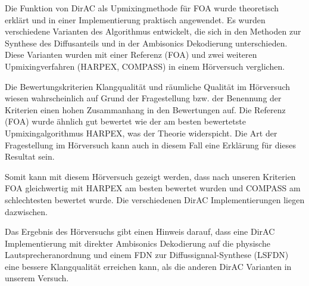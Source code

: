 Die Funktion von DirAC als Upmixingmethode für FOA wurde theoretisch erklärt und in einer Implementierung praktisch angewendet. Es wurden verschiedene Varianten des Algorithmus entwickelt, die sich in den Methoden zur Synthese des Diffusanteils und in der Ambisonics Dekodierung unterschieden. Diese Varianten wurden mit einer Referenz (FOA) und zwei weiteren Upmixingverfahren (HARPEX, COMPASS) in einem Hörversuch verglichen.

Die Bewertungskriterien Klangqualität und räumliche Qualität im Hörversuch wiesen wahrscheinlich auf Grund der Fragestellung bzw. der Benennung der Kriterien einen hohen Zusammanhang in den Bewertungen auf. Die Referenz (FOA) wurde ähnlich gut bewertet wie der am besten bewertetste Upmixingalgorithmus HARPEX, was der Theorie widerspicht. Die Art der Fragestellung im Hörversuch kann auch in diesem Fall eine Erklärung für dieses Resultat sein.

Somit kann mit diesem Hörversuch gezeigt werden, dass nach unseren Kriterien FOA gleichwertig mit HARPEX am besten bewertet wurden und COMPASS am schlechtesten bewertet wurde. Die verschiedenen DirAC Implementierungen liegen dazwischen.

Das Ergebnis des Hörversuchs gibt einen Hinweis darauf, dass eine DirAC Implementierung mit direkter Ambisonics Dekodierung auf die physische Lautsprecheranordnung und einem FDN zur Diffussignnal-Synthese (LSFDN) eine bessere Klangqualität erreichen kann, als die anderen DirAC Varianten in unserem Versuch.
